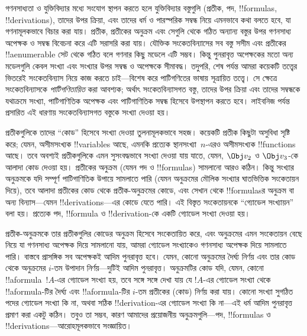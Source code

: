 \documentclass[../../../include/open-logic-section]{subfiles}
\begin{document}

গণনসাধ্যতা ও যুক্তিবিদ্যার মধ্যে সংযোগ স্থাপন করতে হলে যুক্তিবিদ্যার বস্তুগুলি
(প্রতীক, পদ, !!{formula}s, !!{derivation}s), তাদের উপর ক্রিয়া, এবং তাদের ধর্ম
ও পারস্পরিক সম্বন্ধ নিয়ে এমনভাবে কথা বলতে হবে, যা গণনামূলকভাবে বিচার করা
যায়। প্রতীক, প্রতীকের অনুক্রম এবং সেগুলি থেকে গঠিত অন্যান্য বস্তুর উপর
গণনসাধ্য অপেক্ষক ও সম্বন্ধ বিবেচনা করে এটি সরাসরি করা যায়। যৌক্তিক
সংকেতবিন্যাসের সব বস্তু সসীম এবং প্রতীকের !!a{enumerable} সেট থেকে গঠিত বলে
গণনার কিছু মডেলে এটি সম্ভব। কিন্তু পুনরাবৃত্ত অপেক্ষকের মতো অন্য মডেলগুলি
কেবল সংখ্যা এবং সংখ্যার উপর সম্বন্ধ ও অপেক্ষকে সীমাবদ্ধ। তদুপরি, শেষ পর্যন্ত
আমরা কয়েকটি তত্ত্বের ভিতরেই সংকেতবিন্যাস নিয়ে কাজ করতে চাই—বিশেষ করে
পাটিগণিতের ভাষায় সূত্রায়িত তত্ত্বে। সে ক্ষেত্রে সংকেতবিন্যাসকে
\emph{পাটিগণিতায়িত} করা আবশ্যক; অর্থাৎ সংকেতবিন্যাসগত বস্তু, তাদের উপর ক্রিয়া
এবং তাদের সম্বন্ধকে যথাক্রমে সংখ্যা, পাটিগাণিতিক অপেক্ষক এবং পাটিগাণিতিক
সম্বন্ধ হিসেবে উপস্থাপন করতে হবে। লাইবনিজ পর্যন্ত প্রসারিত এই ধারণায়
সংকেতবিন্যাসগত বস্তুকে সংখ্যা দেওয়া হয়।

প্রতীকগুলিকে তাদের ``কোড'' হিসেবে সংখ্যা দেওয়া তুলনামূলকভাবে সহজ। কয়েকটি
প্রতীক কিছুটা অসুবিধা সৃষ্টি করে; যেমন, অসীমসংখ্যক !!{variable}s আছে, এমনকি
প্রত্যেক স্থানসংখ্যা~$n$-এরও অসীমসংখ্যক !!{function}s আছে। তবে অবশ্যই প্রতীকগুলিকে
এমন সুসংবদ্ধভাবে সংখ্যা দেওয়া যায় যাতে, যেমন, $\Obj v_2$ ও $\Obj v_3$-কে
আলাদা কোড দেওয়া হয়। প্রতীকের অনুক্রম (যেমন পদ ও !!{formula}s) সামলানো আরও
কঠিন। কিন্তু সংখ্যার অনুক্রমকে যদি সম্পূর্ণ পাটিগাণিতিক উপায়ে সামলাতে পারি
(যেমন অনুক্রমের মৌলিক সংখ্যার ঘাতভিত্তিক সংকেতায়ন দিয়ে), তবে আলাদা প্রতীকের
কোড থেকে প্রতীক-অনুক্রমের কোডে, এবং সেখান থেকে !!{formula}sর অনুক্রম বা
অন্য বিন্যাস—যেমন !!{derivation}s—এর কোডে যেতে পারি। এই বিস্তৃত সংকেতায়নকে
``গ্যোডেল সংখ্যায়ন'' বলা হয়। প্রত্যেক পদ, !!{formula} ও !!{derivation}-কে
একটি গ্যোডেল সংখ্যা দেওয়া হয়।

প্রতীক-অনুক্রমকে তার প্রতীকগুলির কোডের অনুক্রম হিসেবে সংকেতায়িত করে, এবং
অনুক্রমের এমন সংকেতায়ন বেছে নিয়ে যা গণনসাধ্য অপেক্ষক দিয়ে সামলানো যায়,
আমরা গ্যোডেল সংখ্যাকেও গণনসাধ্য অপেক্ষক দিয়ে সামলাতে পারি। বাস্তবে প্রাসঙ্গিক
সব অপেক্ষকই আদিম পুনরাবৃত্ত হবে। যেমন, কোনো অনুক্রমের দৈর্ঘ্য নির্ণয় এবং তার
কোড থেকে অনুক্রমের $i$-তম উপাদান নির্ণয়—দুটিই আদিম পুনরাবৃত্ত। অনুক্রমটির
কোড যদি, যেমন, কোনো !!a{formula}~$!A$-এর গ্যোডেল সংখ্যা হয়, তবে সঙ্গে সঙ্গে
দেখা যায় যে $!A$-এর গ্যোডেল সংখ্যা থেকে !!a{formula}-টির দৈর্ঘ্য এবং
!!a{formula}-টির $i$-তম প্রতীকের (কোড) নির্ণয় করা যায়। কোনো সংখ্যা সুগঠিত
পদের গ্যোডেল সংখ্যা কি না, অথবা সঠিক !!{derivation}-এর গ্যোডেল সংখ্যা কি
না—এই ধর্ম আদিম
পুনরাবৃত্ত প্রমাণ করা একটু কঠিন। তবুও তা সম্ভব, কারণ আমাদের প্রয়োজনীয়
অনুক্রমগুলি—পদ, !!{formula}s ও !!{derivation}s—আরোহমূলকভাবে সংজ্ঞায়িত।
\end{document}
